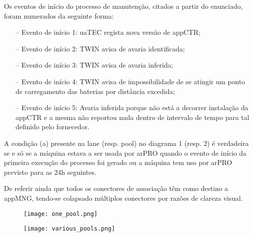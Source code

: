 \documentclass{article}
\begin{document}
    \vspace{0.5em}
    Os eventos de início do processo de manutenção, citados a partir do enunciado, foram numerados da seguinte forma:
    \vspace{-0.1em}
    \begin{itemize}
        \itemsep0em 
        \item[--] Evento de início 1: uaTEC regista nova versão de appCTR;
        \item[--] Evento de início 2: TWIN avisa de avaria identificada;
        \item[--] Evento de início 3: TWIN avisa de avaria inferida;
        \item[--] Evento de início 4: TWIN avisa de impossibilidade de se atingir um ponto de carregamento das baterias por distância excedida;
        \item[--] Evento de início 5: Avaria inferida porque não está a decorrer instalação da appCTR e a mesma não reportou nada dentro de intervalo de tempo para tal definido pelo fornecedor. 
    \end{itemize} \par
    \vspace{-0.1em}
    A condição (a) presente na lane (resp. pool) no diagrama 1 (resp. 2) é verdadeira se e só se a máquina estava a ser usada por arPRO quando o evento
    de início da primeira execução do processo foi gerado ou a máquina tem uso por arPRO previsto para as 24h seguintes. \par
    De referir ainda que todos os conectores de associação têm como destino a appMNG, tendo-se colapsado múltiplos conectores por razões de clareza visual.
    \pagebreak

    \begin{figure}[H]
        \centering
        \texttt{[image: one\_pool.png]}
    \end{figure}

    \pagebreak


    \begin{figure}[H]
        \centering
        \texttt{[image: various\_pools.png]}
    \end{figure}
\end{document}

